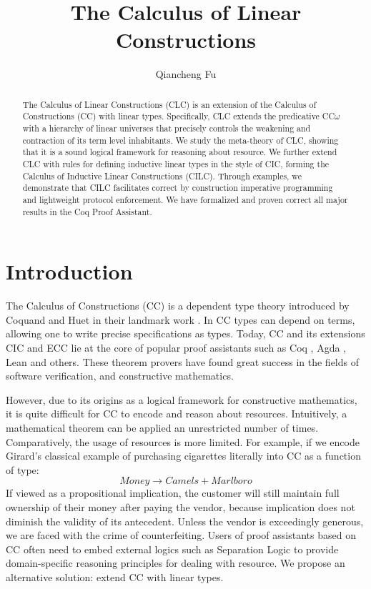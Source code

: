 \documentclass[sigplan,screen,review,authordraft]{acmart}
\title{The Calculus of Linear Constructions}
\author{Qiancheng Fu}
\affiliation{
  \institution{Boston University}
  \city{Boston}
  \state{MA}
  \country{USA}
}
\begin{document}
\begin{abstract}
  The Calculus of Linear Constructions (CLC) is an extension of the Calculus of Constructions (CC) with linear types. Specifically, CLC extends the predicative CC$\omega$ with a hierarchy of linear universes that precisely controls the weakening and contraction of its term level inhabitants. We study the meta-theory of CLC, showing that it is a sound logical framework for reasoning about resource. We further extend CLC with rules for defining inductive linear types in the style of CIC, forming the Calculus of Inductive Linear Constructions (CILC). Through examples, we demonstrate that CILC facilitates correct by construction imperative programming and lightweight protocol enforcement. We have formalized and proven correct all major results in the Coq Proof Assistant.
\end{abstract}
\maketitle


\section{Introduction}
The Calculus of Constructions (CC) is a dependent type theory introduced by Coquand and Huet in their landmark work \cite{cc}. In CC types can depend on terms, allowing one to write precise specifications as types. Today, CC and its extensions CIC \cite{cic} and ECC \cite{ecc} lie at the core of popular proof assistants such as Coq \cite{coq}, Agda \cite{agda}, Lean \cite{lean} and others. These theorem provers have found great success in the fields of software verification, and constructive mathematics.

However, due to its origins as a logical framework for constructive mathematics, it is quite difficult for CC to encode and reason about resources. Intuitively, a mathematical theorem can be applied an unrestricted number of times. Comparatively, the usage of resources is more limited. For example, if we encode Girard's classical example \cite{girard95} of purchasing cigarettes literally into CC as a function of type:
\begin{equation*}
  Money \rightarrow Camels + Marlboro
\end{equation*}
If viewed as a propositional implication, the customer will still maintain full ownership of their money after paying the vendor, because implication does not diminish the validity of its antecedent. Unless the vendor is exceedingly generous, we are faced with the crime of counterfeiting. Users of proof assistants based on CC often need to embed external logics such as Separation Logic to provide domain-specific reasoning principles for dealing with resource. We propose an alternative solution: extend CC with linear types.
\end{document}
